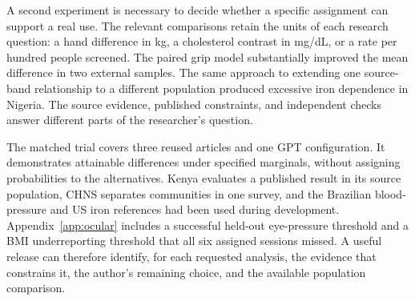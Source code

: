\documentclass[sigconf,anonymous,review]{acmart}
\begin{document}
A second experiment is necessary to decide whether a specific assignment can support a real use. The relevant comparisons retain the units of each research question: a hand difference in kg, a cholesterol contrast in mg/dL, or a rate per hundred people screened. The paired grip model substantially improved the mean difference in two external samples. The same approach to extending one source-band relationship to a different population produced excessive iron dependence in Nigeria. The source evidence, published constraints, and independent checks answer different parts of the researcher's question.

The matched trial covers three reused articles and one GPT configuration. It demonstrates attainable differences under specified marginals, without assigning probabilities to the alternatives. Kenya evaluates a published result in its source population, CHNS separates communities in one survey, and the Brazilian blood-pressure and US iron references had been used during development. Appendix~\ref{app:ocular} includes a successful held-out eye-pressure threshold and a BMI underreporting threshold that all six assigned sessions missed. A useful release can therefore identify, for each requested analysis, the evidence that constrains it, the author's remaining choice, and the available population comparison.


\clearpage
\appendix

\end{document}
